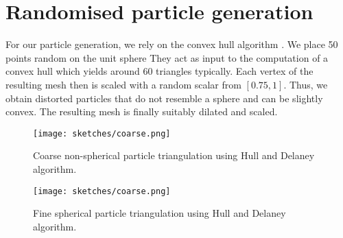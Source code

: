 \section{Randomised particle generation}
\label{section:randomised-particle-generation}

For our particle generation, we rely on the convex hull algorithm
\cite{mattutis,3,5}.
We place 50 points random on the unit sphere
They act as input to the computation of a convex hull which yields around 60
triangles typically.
Each vertex of the resulting mesh then is scaled with a random scalar from
$[0.75,1]$.
Thus, we obtain distorted particles that do not resemble a sphere and can be
slightly convex.
The resulting mesh is finally suitably dilated and scaled.

\begin{figure}[htb]
  \begin{center}
    \texttt{[image: sketches/coarse.png]}
  \end{center}
  \caption{Coarse non-spherical particle triangulation using Hull and Delaney algorithm.}
  \label{figure:coarse_particle}
\end{figure}

\begin{figure}[htb]
  \begin{center}
    \texttt{[image: sketches/coarse.png]}
  \end{center}
  \caption{Fine spherical particle triangulation using Hull and Delaney algorithm.}
  \label{figure:fine_particle}
\end{figure}


